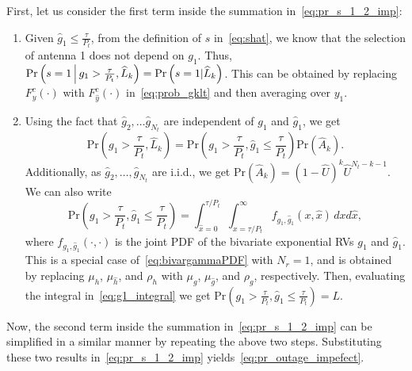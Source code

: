 \documentclass[12pt,draftcls,peerreview,onecolumn]{IEEEtran}
\newcommand{\brac}[1]{\left({#1}\right)}
\newcommand{\prob}[1]{\text{Pr}\brac{#1}}
\newcommand{\given}{\arrowvert}
\newcommand{\Given}{\Big\arrowvert}
\newcommand{\setA}{A}
\newcommand{\setAkhat}{\widehat{\setA}_k}
\newcommand{\setL}{L}
\newcommand{\setLkhat}{\widehat{\setL}_k}
\newcommand{\mug}{{\mu_{g}}}
\newcommand{\muh}{{\mu_{h}}}
\newcommand{\Nt}{{N_t}}
\newcommand{\Nr}{{N_r}}
\newcommand{\Pt}{{P_t}}
\newcommand{\such}{h}
\newcommand{\puch}{g}
\newcommand{\gk}[1]{{\puch_{#1}}}
\newcommand{\itau}{\tau}
\newcommand{\taubypt}{\frac{\itau}{\Pt}}
\newcommand{\gkgrtaubypt}[1]{{\gk{#1}}>\taubypt}
\newcommand{\gkhatlttaubypt}[1]{{\gkhat{#1}}\leq\taubypt}
\newcommand{\yk}[1]{y_{#1}}
\newcommand{\un}{U}
\newcommand{\unhat}{\widehat{\un}}
\newcommand{\gpilotpower}{P_g}
\newcommand{\hhat}{\hat{\such}}
\newcommand{\ghat}{\hat{\puch}}
\newcommand{\yhat}{\hat{y}}
\newcommand{\gkhat}[1]{\ghat_{#1}}
\newcommand{\muhhat}{\mu_{\hhat}}
\newcommand{\mughat}{\mu_{\ghat}}
\newcommand{\rhog}{\rho_g}
\newcommand{\rhoh}{\rho_h}
\newcommand{\ccdfyrv}[1]{ F^{c}_{y}\left(#1 \right) }
\newcommand{\ccdfyhatrv}[1]{F^{c}_{\yhat}\left(#1 \right) }
\newcommand{\xhat}{\hat{x}}
\begin{document}
First, let us consider the first term inside the summation in~\eqref{eq:pr_s_1_2_imp}:
\begin{enumerate}
\item  Given $\gkhatlttaubypt{1}$, from the definition of $s$ in~\eqref{eq:shat}, we know that the selection of antenna 1 does not depend on $\gk{1}$. Thus, $\prob{s = 1 \Given \gkgrtaubypt{1},\setLkhat}=\prob{s = 1 \given \setLkhat}$. This can be obtained by replacing $\ccdfyrv{\cdot}$ with $\ccdfyhatrv{\cdot}$ in~\eqref{eq:prob_gklt} and then averaging over $\yk{1}$. 

\item Using the fact that $\gkhat{2},\ldots\gkhat{\Nt}$ are independent of $\gk{1}$ and $\gkhat{1}$, we get  
\begin{equation}
\prob{\gkgrtaubypt{1},\setLkhat} =\prob{\gkgrtaubypt{1},\gkhatlttaubypt{1}}\prob{\setAkhat}. 
\end{equation}
Additionally, as $\gkhat{2},\ldots,\gkhat{\Nt}$ are i.i.d., we get $\prob{\setAkhat}=\left(1- \unhat \right)^{k} \unhat^{\Nt-k-1}$. We can also write
\begin{equation}
\label{eq:g1_integral}
\prob{\gkgrtaubypt{1},\gkhatlttaubypt{1}}=\int_{\xhat=0}^{\tau/\Pt}\int_{x=\tau/\Pt}^{\infty}f_{\gk{1},\gkhat{1}}\left(x,\xhat \right)\,dx d\xhat,
\end{equation}
where $f_{\gk{1},\gkhat{1}}\left(\cdot,\cdot \right)$ is the joint PDF of the bivariate exponential RVs $\gk{1}$ and $\gkhat{1}$.  This is a special case of~\eqref{eq:bivargammaPDF} with $\Nr=1$, and is obtained by replacing $\muh$, $\muhhat$, and $\rhoh$ with $\mug$, $\mughat$, and $\rhog$, respectively.
\label{eq:bivargPDF}
Then, evaluating the integral in~\eqref{eq:g1_integral} we get $\prob{\gkgrtaubypt{1},\gkhatlttaubypt{1}} \!=\! L$.

\end{enumerate}

Now, the second term inside the summation in~\eqref{eq:pr_s_1_2_imp}  can be simplified in a similar manner by repeating the above two steps.  Substituting these two results in~\eqref{eq:pr_s_1_2_imp} yields~\eqref{eq:pr_outage_impefect}.
 





%
\end{document}

